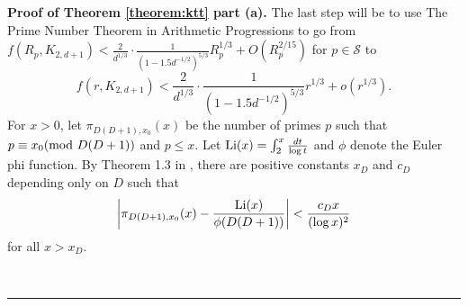 \documentclass[12pt]{article}%
\newenvironment{proof}[1][Proof]{\noindent\textbf{#1.} }
{\hfill \ \rule{0.5em}{0.5em}}
\begin{document}
\begin{proof}[Proof of Theorem \ref{theorem:ktt} part (a)]
The last step will be to use The Prime Number Theorem in Arithmetic Progressions to go from 
$f(R_p , K_{2,d + 1} ) < \frac{ 2  } { d^{1/3}} \cdot 
\frac{ 1}{ ( 1 - 1.5d^{-1/2} )^{5/3} }    R_p^{1/3} + O(R_p^{2/15})$ for $p \in \mathcal{S}$ to 
\[
f(r  , K_{2, d+1} ) < 
\frac{ 2  } { d^{1/3}} \cdot 
\frac{ 1}{ ( 1 - 1.5d^{-1/2} )^{5/3} }    r^{1/3} + o(r^{1/3}).
\]
For $x > 0$, let $\pi_{ D (D+1) , x_0} (x)$ be the number of primes $p$ such that $p \equiv x_0 ( \textup{mod}~ D(D+1))$ and $p \leq x$.  
Let $\textup{Li}(x) = \int_2^x \frac{dt}{ \log t }$ and $\phi$ denote the Euler phi function.  By Theorem 1.3 in \cite{Bennett}, there are positive constants $x_D$ and $c_D$ depending only on $D$ such that 
\begin{equation} \label{PNT}
\left| \pi_{D(D+1) , x_0 } (x) - \dfrac{ \textup{Li}(x) }{ \phi (D(D+1)) } \right| 
<  \frac{ c_D x}{ ( \log x)^2 }
\end{equation}
for all $x > x_D$. 


\end{proof}
\end{document}
